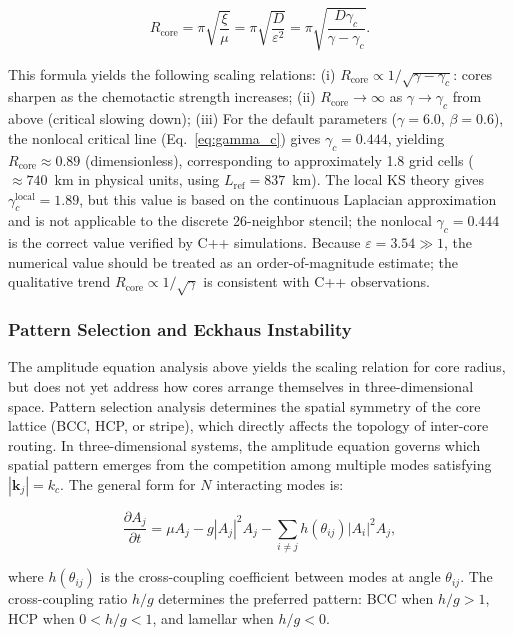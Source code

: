 \documentclass[sn-nature,pdflatex]{sn-jnl}
\begin{document}
\begin{equation}
\label{eq:core_radius}
R_{\text{core}} = \pi \sqrt{\frac{\xi}{\mu}} = \pi \sqrt{\frac{D}{\varepsilon^2}} = \pi \sqrt{\frac{D \gamma_c}{\gamma - \gamma_c}}.
\end{equation}

This formula yields the following scaling relations:
(i) $R_{\text{core}} \propto 1/\sqrt{\gamma - \gamma_c}$: cores sharpen as the chemotactic strength increases;
(ii) $R_{\text{core}} \to \infty$ as $\gamma \to \gamma_c$ from above (critical slowing down);
(iii) For the default parameters ($\gamma = 6.0$, $\beta = 0.6$), the nonlocal critical line (Eq.~\ref{eq:gamma_c}) gives $\gamma_c = 0.444$, yielding $R_{\text{core}} \approx 0.89$ (dimensionless), corresponding to approximately 1.8 grid cells ($\approx 740$~km in physical units, using $L_{\text{ref}} = 837$~km). The local KS theory gives $\gamma_c^{\text{local}} = 1.89$, but this value is based on the continuous Laplacian approximation and is not applicable to the discrete 26-neighbor stencil; the nonlocal $\gamma_c = 0.444$ is the correct value verified by C++ simulations. Because $\varepsilon = 3.54 \gg 1$, the numerical value should be treated as an order-of-magnitude estimate; the qualitative trend $R_{\text{core}} \propto 1/\sqrt{\gamma}$ is consistent with C++ observations.

\subsubsection{Pattern Selection and Eckhaus Instability}

The amplitude equation analysis above yields the scaling relation for core radius, but does not yet address how cores arrange themselves in three-dimensional space. Pattern selection analysis determines the spatial symmetry of the core lattice (BCC, HCP, or stripe), which directly affects the topology of inter-core routing. In three-dimensional systems, the amplitude equation governs which spatial pattern emerges from the competition among multiple modes satisfying $|\mathbf{k}_j| = k_c$. The general form for $N$ interacting modes is:

\begin{equation}
\frac{\partial A_j}{\partial t} = \mu A_j - g |A_j|^2 A_j - \sum_{i \neq j} h(\theta_{ij}) |A_i|^2 A_j,
\end{equation}

where $h(\theta_{ij})$ is the cross-coupling coefficient between modes at angle $\theta_{ij}$. The cross-coupling ratio $h/g$ determines the preferred pattern: BCC when $h/g > 1$, HCP when $0 < h/g < 1$, and lamellar when $h/g < 0$.
\end{document}
